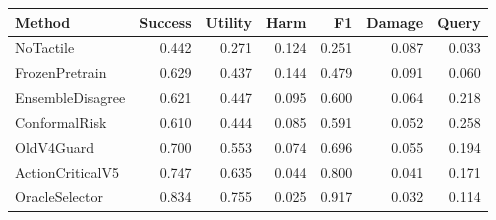 \begin{tabular}{lrrrrrr}
\toprule
Method & Success & Utility & Harm & F1 & Damage & Query \\
\midrule
NoTactile & 0.442 & 0.271 & 0.124 & 0.251 & 0.087 & 0.033 \\
FrozenPretrain & 0.629 & 0.437 & 0.144 & 0.479 & 0.091 & 0.060 \\
EnsembleDisagree & 0.621 & 0.447 & 0.095 & 0.600 & 0.064 & 0.218 \\
ConformalRisk & 0.610 & 0.444 & 0.085 & 0.591 & 0.052 & 0.258 \\
OldV4Guard & 0.700 & 0.553 & 0.074 & 0.696 & 0.055 & 0.194 \\
ActionCriticalV5 & 0.747 & 0.635 & 0.044 & 0.800 & 0.041 & 0.171 \\
OracleSelector & 0.834 & 0.755 & 0.025 & 0.917 & 0.032 & 0.114 \\
\bottomrule
\end{tabular}